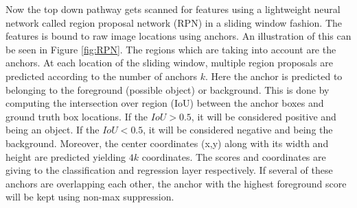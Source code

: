 \documentclass[../Head/Main.tex]{subfiles}
\begin{document}
Now the top down pathway gets scanned for features using a lightweight neural network called region proposal network (RPN) in a sliding window fashion. The features is bound to raw image locations using anchors.
An illustration of this can be seen in Figure \ref{fig:RPN}. The regions which are taking into account are the anchors. At each location of the sliding window, multiple region proposals are predicted according to the number of anchors $k$. Here the anchor is predicted to belonging to the foreground (possible object) or background. This is done by computing the intersection over region (IoU) between the anchor boxes and ground truth box locations. If the $IoU > 0.5$, it will be considered positive and being an object. If the $IoU < 0.5$, it will be considered negative and being the background. Moreover, the center coordinates (x,y) along with its width and height are predicted yielding $4k$ coordinates. The scores and coordinates are giving to the classification and regression layer respectively. If several of these anchors are overlapping each other, the anchor with the highest foreground score will be kept using non-max suppression. 
\end{document}
